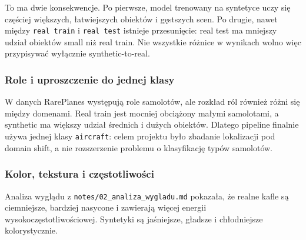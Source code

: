 \documentclass[
  11pt,
]{article}
\begin{document}
To ma dwie konsekwencje. Po pierwsze, model trenowany na syntetyce uczy
się częściej większych, łatwiejszych obiektów i gęstszych scen. Po
drugie, nawet między \texttt{real\ train} i \texttt{real\ test} istnieje
przesunięcie: real test ma mniejszy udział obiektów small niż real
train. Nie wszystkie różnice w wynikach wolno więc przypisywać wyłącznie
synthetic-to-real.

\hypertarget{role-i-uproszczenie-do-jednej-klasy}{%
\subsubsection{Role i uproszczenie do jednej
klasy}\label{role-i-uproszczenie-do-jednej-klasy}}

W danych RarePlanes występują role samolotów, ale rozkład ról również
różni się między domenami. Real train jest mocniej obciążony małymi
samolotami, a synthetic ma większy udział średnich i dużych obiektów.
Dlatego pipeline finalnie używa jednej klasy \texttt{aircraft}: celem
projektu było zbadanie lokalizacji pod domain shift, a nie rozszerzenie
problemu o klasyfikację typów samolotów.

\hypertarget{kolor-tekstura-i-czux119stotliwoux15bci}{%
\subsubsection{Kolor, tekstura i
częstotliwości}\label{kolor-tekstura-i-czux119stotliwoux15bci}}

Analiza wyglądu z \texttt{notes/02\_analiza\_wygladu.md} pokazała, że
realne kafle są ciemniejsze, bardziej nasycone i zawierają więcej
energii wysokoczęstotliwościowej. Syntetyki są jaśniejsze, gładsze i
chłodniejsze kolorystycznie.

\begingroup
{}
\noindent{}
\endgroup
\end{document}
